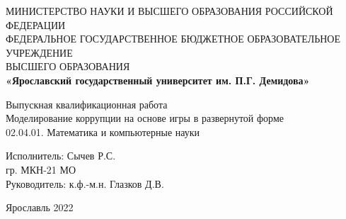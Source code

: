 \begin{center}
	\large{МИНИСТЕРСТВО НАУКИ И ВЫСШЕГО ОБРАЗОВАНИЯ РОССИЙСКОЙ ФЕДЕРАЦИИ}\\
	\footnotesize{ФЕДЕРАЛЬНОЕ ГОСУДАРСТВЕННОЕ БЮДЖЕТНОЕ ОБРАЗОВАТЕЛЬНОЕ УЧРЕЖДЕНИЕ}\\ 
	\footnotesize{ВЫСШЕГО ОБРАЗОВАНИЯ}\\
	\small{\textbf{«Ярославский государственный университет им. П.Г. Демидова»}}\\
	\hfill \break
	\hfill\break
	\hfill \break
	\hfill \break
	\hfill \break
	\hfill \break
	\hfill \break
	\hfill \break
	\hfill \break
	\hfill \break
	
	\normalsize{Выпускная квалификационная работа}\\
	\large{Моделирование коррупции на основе игры в развернутой форме}\\	
	02.04.01. Математика и компьютерные науки\\
	
	\hfill \break
	\hfill \break
	\hfill \break
	\hfill \break
	\hfill \break
\end{center}

\normalsize{ 
	\begin{flushleft}
		\hspace*{80mm}Исполнитель: Сычев Р.С. \\
		\hspace*{80mm}гр. МКН-21 МО \\
		\hspace*{80mm}Руководитель: к.ф.-м.н. Глазков Д.В.
	\end{flushleft}
}
\hfill \break
\hfill \break
\hfill \break
\hfill \break
\hfill \break
\hfill \break
\begin{center} Ярославль 2022 \end{center}
\thispagestyle{empty} %
